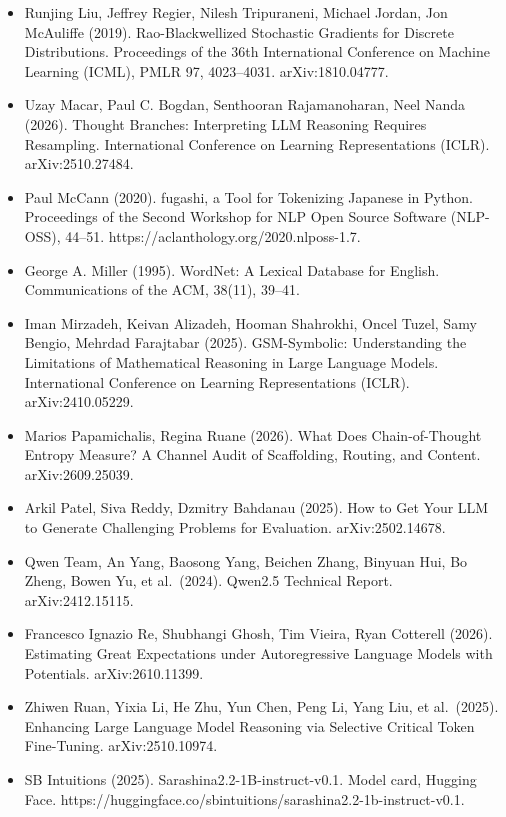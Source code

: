 \documentclass[
  10pt,
  a4paper,
]{article}
\begin{document}
\begin{itemize}
  the 42nd International Conference on Machine Learning (ICML), PMLR 267, 37906--37918. arXiv:2411.19943.
\item
  Runjing Liu, Jeffrey Regier, Nilesh Tripuraneni, Michael Jordan, Jon McAuliffe (2019). Rao-Blackwellized Stochastic Gradients for Discrete Distributions. Proceedings of the 36th International
  Conference on Machine Learning (ICML), PMLR 97, 4023--4031. arXiv:1810.04777.
\item
  Uzay Macar, Paul C. Bogdan, Senthooran Rajamanoharan, Neel Nanda (2026). Thought Branches: Interpreting LLM Reasoning Requires Resampling. International Conference on Learning Representations
  (ICLR). arXiv:2510.27484.
\item
  Paul McCann (2020). fugashi, a Tool for Tokenizing Japanese in Python. Proceedings of the Second Workshop for NLP Open Source Software (NLP-OSS), 44--51. https://aclanthology.org/2020.nlposs-1.7.
\item
  George A. Miller (1995). WordNet: A Lexical Database for English. Communications of the ACM, 38(11), 39--41.
\item
  Iman Mirzadeh, Keivan Alizadeh, Hooman Shahrokhi, Oncel Tuzel, Samy Bengio, Mehrdad Farajtabar (2025). GSM-Symbolic: Understanding the Limitations of Mathematical Reasoning in Large Language Models.
  International Conference on Learning Representations (ICLR). arXiv:2410.05229.
\item
  Marios Papamichalis, Regina Ruane (2026). What Does Chain-of-Thought Entropy Measure? A Channel Audit of Scaffolding, Routing, and Content. arXiv:2609.25039.
\item
  Arkil Patel, Siva Reddy, Dzmitry Bahdanau (2025). How to Get Your LLM to Generate Challenging Problems for Evaluation. arXiv:2502.14678.
\item
  Qwen Team, An Yang, Baosong Yang, Beichen Zhang, Binyuan Hui, Bo Zheng, Bowen Yu, et al.~(2024). Qwen2.5 Technical Report. arXiv:2412.15115.
\item
  Francesco Ignazio Re, Shubhangi Ghosh, Tim Vieira, Ryan Cotterell (2026). Estimating Great Expectations under Autoregressive Language Models with Potentials. arXiv:2610.11399.
\item
  Zhiwen Ruan, Yixia Li, He Zhu, Yun Chen, Peng Li, Yang Liu, et al.~(2025). Enhancing Large Language Model Reasoning via Selective Critical Token Fine-Tuning. arXiv:2510.10974.
\item
  SB Intuitions (2025). Sarashina2.2-1B-instruct-v0.1. Model card, Hugging Face. https://huggingface.co/sbintuitions/sarashina2.2-1b-instruct-v0.1.

\end{itemize}
\end{document}
